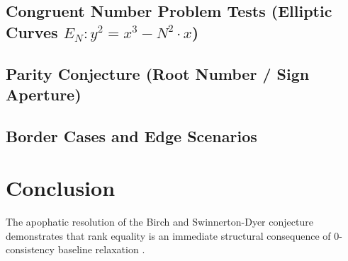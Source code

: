 \documentclass[11pt,a4paper]{article}
\begin{document}
\subsection{Congruent Number Problem Tests (Elliptic Curves \texorpdfstring{$E_N: y^2 = x^3 - N^2 \cdot x$}{Eₙ: y² = x³ - N² x})}
\begin{figure}[H]
\centering
\begin{minipage}{0.95\textwidth}

\end{minipage}
\end{figure}

\subsection{Parity Conjecture (Root Number / Sign Aperture)}
\begin{figure}[H]
\centering
\begin{minipage}{0.95\textwidth}

\end{minipage}
\end{figure}

\subsection{Border Cases and Edge Scenarios}
\begin{figure}[H]
\centering
\begin{minipage}{0.95\textwidth}

\end{minipage}
\end{figure}

\section{Conclusion}
The apophatic resolution of the Birch and Swinnerton-Dyer conjecture demonstrates that rank equality is an immediate structural consequence of $0$-consistency baseline relaxation \cite{nicht_theory_monograph}.

\clearpage


\end{document}
